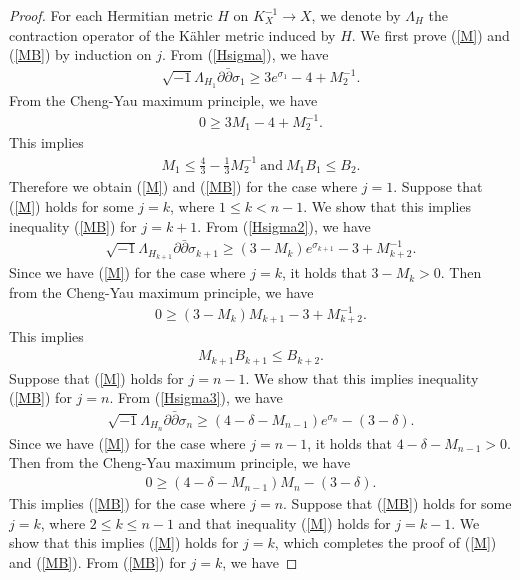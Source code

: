 \documentclass[10pt,a4paper]{amsart}
\def\inum{{\sqrt{-1}}}
\begin{document}
\begin{proof}
For each Hermitian metric $H$ on $K_X^{-1}\rightarrow X$, we denote by $\Lambda_{H}$ the contraction operator of the K\"ahler metric induced by $H$. We first prove (\ref{M}) and (\ref{MB}) by induction on $j$. From (\ref{Hsigma}), we have 
\begin{align*}
\inum\Lambda_{H_1}\partial \bar{\partial} \sigma_1\geq 3e^{\sigma_1}-4+M_2^{-1}.
\end{align*}
From the Cheng-Yau maximum principle, we have
\begin{align*}
0\geq 3M_1-4+M_2^{-1}.
\end{align*}
This implies
\begin{align*}
M_1\leq \frac{4}{3}-\frac{1}{3}M_2^{-1} \ \text{and} \ M_1B_1\leq B_2.
\end{align*}
Therefore we obtain (\ref{M}) and (\ref{MB}) for the case where $j=1$.
Suppose that (\ref{M}) holds for some $j=k$, where $1\leq k<n-1$. We show that this implies inequality (\ref{MB}) for $j=k+1$. From (\ref{Hsigma2}), we have 
\begin{align*}
\inum \Lambda_{H_{k+1}}\partial\bar{\partial}\sigma_{k+1} \geq (3-M_k)e^{\sigma_{k+1}}-3+M_{k+2}^{-1}.
\end{align*}
Since we have (\ref{M}) for the case where $j=k$, it holds that $3-M_k>0$. Then from the Cheng-Yau maximum principle, we have
\begin{align*}
0\geq (3-M_k)M_{k+1}-3+M_{k+2}^{-1}.
\end{align*}
This implies 
\begin{align*}
M_{k+1}B_{k+1} \leq B_{k+2}.
\end{align*}
Suppose that (\ref{M}) holds for $j=n-1$. We show that this implies inequality (\ref{MB}) for $j=n$. From (\ref{Hsigma3}), we have
\begin{align*}
\inum \Lambda_{H_n}\partial\bar{\partial} \sigma_n\geq (4-\delta-M_{n-1})e^{\sigma_n}-(3-\delta). 
\end{align*}
Since we have (\ref{M}) for the case where $j=n-1$, it holds that $4-\delta-M_{n-1}>0$. Then from the Cheng-Yau maximum principle, we have 
\begin{align*}
0\geq (4-\delta-M_{n-1})M_n-(3-\delta).
\end{align*}
This implies (\ref{MB}) for the case where $j=n$. Suppose that (\ref{MB}) holds for some $j=k$, where $2\leq k\leq n-1$ and that inequality (\ref{M}) holds for $j=k-1$. We show that this implies (\ref{M}) holds for $j=k$, which completes the proof of (\ref{M}) and (\ref{MB}). From (\ref{MB}) for $j=k$, we have

\end{proof}
\end{document}
